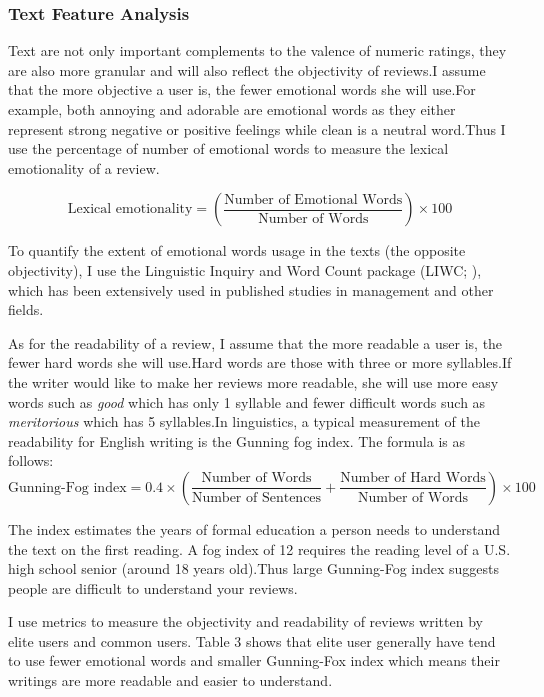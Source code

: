 \documentclass[12pt]{article}%
\begin{document}
\subsubsection{Text Feature Analysis}
Text are not only important complements to the valence of numeric ratings, they are also more granular and will also reflect the objectivity of reviews.I assume that the more objective a user is, the fewer emotional words she will use.For example, both annoying and adorable are emotional words as they either represent strong negative or positive feelings while clean is a neutral word.Thus I use the percentage of number of emotional words to measure the lexical emotionality of a review.

\begin{equation}
\text{Lexical emotionality} = (\frac{\text{Number of Emotional Words}}{\text{Number of Words}})\times 100
\end{equation}

To quantify the extent of emotional words usage in the texts (the opposite objectivity), I use the Linguistic Inquiry and Word Count package (LIWC; \citep{francis1993linguistic}), which has been extensively used in published studies in management and other fields\citep{berger2012makes,bednar2012watchdog,brett2007sticks}.

As for  the readability of a review, I assume that the more readable a user is, the fewer hard words she will use.Hard words are those with three or more syllables.If the writer would like to make her reviews more readable, she will use more easy words such as \emph{good} which has only 1 syllable and fewer difficult words such as \emph{meritorious} which has 5 syllables.In linguistics, a typical measurement of the readability for English writing is the Gunning fog index. The formula is as follows:
\begin{equation}
\text{Gunning-Fog index} =0.4 \times(\frac{\text{Number of Words}}{\text{Number of Sentences}}+\frac{\text{Number of Hard Words}}{\text{Number of Words}})\times 100
\end{equation}

The index estimates the years of formal education a person needs to understand the text on the first reading. A fog index of 12 requires the reading level of a U.S. high school senior (around 18 years old).Thus large Gunning-Fog index suggests people are difficult to understand your reviews.  

I use metrics to measure the objectivity and readability of reviews written by elite users and common users. Table 3 shows that elite user generally have tend to use fewer emotional words and smaller Gunning-Fox index which means their writings are more readable and easier to understand.
\end{document}
